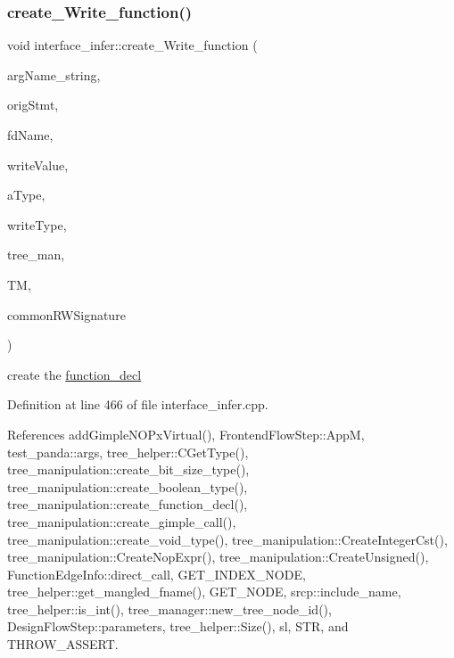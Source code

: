 \subsubsection{\texorpdfstring{create\+\_\+\+Write\+\_\+function()}{create\_Write\_function()}}
{\footnotesize\ttfamily void interface\+\_\+infer\+::create\+\_\+\+Write\+\_\+function (\begin{DoxyParamCaption}\item[{const std\+::string \&}]{arg\+Name\+\_\+string,  }\item[{\hyperlink{tree__node_8hpp_a6ee377554d1c4871ad66a337eaa67fd5}{tree\+\_\+node\+Ref}}]{orig\+Stmt,  }\item[{const std\+::string \&}]{fd\+Name,  }\item[{\hyperlink{tree__node_8hpp_a6ee377554d1c4871ad66a337eaa67fd5}{tree\+\_\+node\+Ref}}]{write\+Value,  }\item[{\hyperlink{tree__node_8hpp_a6ee377554d1c4871ad66a337eaa67fd5}{tree\+\_\+node\+Ref}}]{a\+Type,  }\item[{\hyperlink{tree__node_8hpp_a6ee377554d1c4871ad66a337eaa67fd5}{tree\+\_\+node\+Ref}}]{write\+Type,  }\item[{const \hyperlink{tree__manipulation_8hpp_a1a9460e3a2f9fc6a96cfd2f24cc9b2a5}{tree\+\_\+manipulation\+Ref}}]{tree\+\_\+man,  }\item[{const \hyperlink{tree__manager_8hpp_a96ff150c071ce11a9a7a1e40590f205e}{tree\+\_\+manager\+Ref}}]{TM,  }\item[{bool}]{common\+R\+W\+Signature }\end{DoxyParamCaption})\hspace{0.3cm}{\ttfamily [private]}}

create the \hyperlink{structfunction__decl}{function\+\_\+decl} 

Definition at line 466 of file interface\+\_\+infer.\+cpp.



References add\+Gimple\+N\+O\+Px\+Virtual(), Frontend\+Flow\+Step\+::\+AppM, test\+\_\+panda\+::args, tree\+\_\+helper\+::\+C\+Get\+Type(), tree\+\_\+manipulation\+::create\+\_\+bit\+\_\+size\+\_\+type(), tree\+\_\+manipulation\+::create\+\_\+boolean\+\_\+type(), tree\+\_\+manipulation\+::create\+\_\+function\+\_\+decl(), tree\+\_\+manipulation\+::create\+\_\+gimple\+\_\+call(), tree\+\_\+manipulation\+::create\+\_\+void\+\_\+type(), tree\+\_\+manipulation\+::\+Create\+Integer\+Cst(), tree\+\_\+manipulation\+::\+Create\+Nop\+Expr(), tree\+\_\+manipulation\+::\+Create\+Unsigned(), Function\+Edge\+Info\+::direct\+\_\+call, G\+E\+T\+\_\+\+I\+N\+D\+E\+X\+\_\+\+N\+O\+DE, tree\+\_\+helper\+::get\+\_\+mangled\+\_\+fname(), G\+E\+T\+\_\+\+N\+O\+DE, srcp\+::include\+\_\+name, tree\+\_\+helper\+::is\+\_\+int(), tree\+\_\+manager\+::new\+\_\+tree\+\_\+node\+\_\+id(), Design\+Flow\+Step\+::parameters, tree\+\_\+helper\+::\+Size(), sl, S\+TR, and T\+H\+R\+O\+W\+\_\+\+A\+S\+S\+E\+RT.



